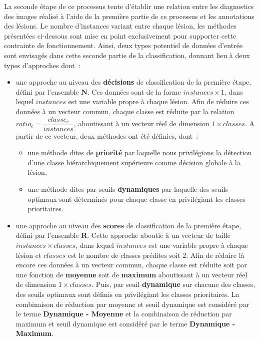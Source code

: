 La seconde étape de ce processus tente d'établir une relation entre les diagnostics des images réalisé à l'aide de la première partie de ce processus et les annotations des lésions. Le nombre d'instances variant entre chaque lésion, les méthodes présentées ci-dessous sont mise en point exclusivement pour supporter cette contrainte de fonctionnement. Ainsi, deux types potentiel de données d'entrée sont envisagés dans cette seconde partie de la classification, donnant lieu à deux types d'approches dont~:
\begin{itemize}
    \item   une approche au niveau des \textbf{décisions} de classification de la première étape, défini par l'ensemble $\mathbf{N}$. Ces données sont de la forme $instances \times 1$, dans lequel $instances$ est une variable propre à chaque lésion. Afin de réduire ces données à un vecteur commun, chaque classe est réduite par la relation $ratio_c = \dfrac{classe_c}{instances}$, aboutissant à un vecteur réel de dimension $1 \times classes$. A partir de ce vecteur, deux méthodes ont été définies, dont~:
            \begin{itemize}
                \item une méthode dites de \textbf{priorité} par laquelle nous privilégions la détection d'une classe hiérarchiquement supérieure comme décision globale à la lésion,
                \item une méthode dites par seuils \textbf{dynamiques} par laquelle des seuils optimaux sont déterminés pour chaque classe en privilégiant les classes prioritaires.
            \end{itemize}
    \item   une approche au niveau des \textbf{scores} de classification de la première étape, défini par l'ensemble $\mathbf{R}$. Cette approche aboutie à un vecteur de taille $instances \times classes$, dans lequel $instances$ est une variable propre à chaque lésion et $classes$ est le nombre de classes prédites soit 2. Afin de réduire là encore ces données à un vecteur commun, chaque classe est réduite soit par une fonction de \textbf{moyenne} soit de \textbf{maximum} aboutissant à un vecteur réel de dimension $1 \times classes$. Puis, par seuil \textbf{dynamique} sur chacune des classes, des seuils optimaux sont définis en privilégiant les classes prioritaires. La combinaison de réduction par moyenne et seuil dynamique est considéré par le terme \textbf{Dynamique - Moyenne} et la combinaison de réduction par maximum et seuil dynamique est considéré par le terme \textbf{Dynamique - Maximum}.
\end{itemize}\par
\clearpage


